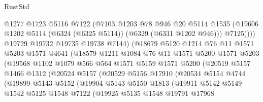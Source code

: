 \begin{lexlean}{RustStd}
\begin{coremodule}
{{                          @1277
                          @1723
                          @5116
                          @7122
                          (@7103
                            @1203
                            @78
                            @946
                            @20
                            @5114
                            @1535
                            (@19606 @1202 @5114 (@6324 (@6325 @5114)) (@6329 (@6331 @1202 @946)))
                            @7125))))
                    @19729
                    @19732
                    @19735
                    @19738
                    @7144)
                  (@18679
                    @5120
                    @1214
                    @76
                    @11
                    @1571
                    @5203
                    @1571
                    @4641
                    (@18579
                      @1211
                      @1084
                      @76
                      @11
                      @1571
                      @5200
                      @1571
                      @5203
                      (@19568
                        @1102
                        @1079
                        @566
                        @564
                        @1571
                        @5159
                        @1571
                        @5200
                        (@20519
                          @5157
                          @1466
                          @1312
                          (@20524
                            @5157
                            (@20529
                              @5156
                              @17910
                              (@20534
                                @5154
                                @4744
                                (@19899
                                  @5143
                                  @5152
                                  (@19904
                                    @5143
                                    @5150
                                    @1813
                                    (@19911
                                      @5142
                                      @5149
                                      @1542
                                      @5125
                                      @1548
                                      @7122
                                      (@19925
                                        @5135
                                        @1548
                                        @19791
                                        @17968
}}
\end{coremodule}
\end{lexlean}
